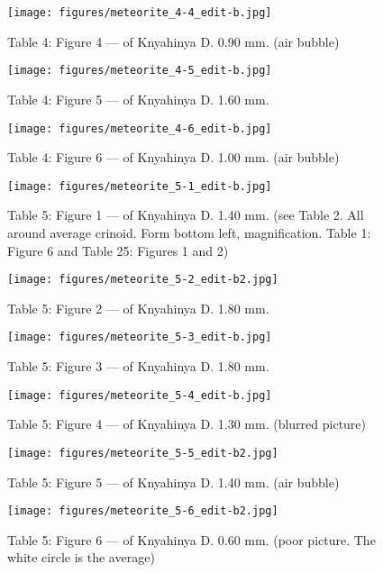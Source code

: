 \documentclass[a4paper, 12pt, oneside]{article}
\begin{document}
\clearpage
\begin{figure}[t]
\texttt{[image: figures/meteorite\_4-4\_edit-b.jpg]}
\caption{Table 4: Figure 4 --- of Knyahinya D. 0.90 mm. (air bubble)}
\centering
\end{figure}
\clearpage
\begin{figure}[t]
\texttt{[image: figures/meteorite\_4-5\_edit-b.jpg]}
\caption{Table 4: Figure 5 --- of Knyahinya D. 1.60 mm.}
\centering
\end{figure}
\clearpage
\begin{figure}[t]
\texttt{[image: figures/meteorite\_4-6\_edit-b.jpg]}
\caption{Table 4: Figure 6 --- of Knyahinya D. 1.00 mm. (air bubble)}
\centering
\end{figure}
\clearpage
\begin{figure}[t]
\texttt{[image: figures/meteorite\_5-1\_edit-b.jpg]}
\caption{Table 5: Figure 1 --- of Knyahinya D. 1.40 mm. (see Table 2. All around average crinoid. Form bottom left, magnification. Table 1: Figure 6 and Table 25: Figures 1 and 2)}
\centering
\end{figure}
\clearpage
\begin{figure}[t]
\texttt{[image: figures/meteorite\_5-2\_edit-b2.jpg]}
\caption{Table 5: Figure 2 --- of Knyahinya D. 1.80 mm.}
\centering
\end{figure}
\clearpage
\begin{figure}[t]
\texttt{[image: figures/meteorite\_5-3\_edit-b.jpg]}
\caption{Table 5: Figure 3 --- of Knyahinya D. 1.80 mm.}
\centering
\end{figure}
\clearpage
\begin{figure}[t]
\texttt{[image: figures/meteorite\_5-4\_edit-b.jpg]}
\caption{Table 5: Figure 4 --- of Knyahinya D. 1.30 mm. (blurred picture)}
\centering
\end{figure}
\clearpage
\begin{figure}[t]
\texttt{[image: figures/meteorite\_5-5\_edit-b2.jpg]}
\caption{Table 5: Figure 5 --- of Knyahinya D. 1.40 mm. (air bubble)}
\centering
\end{figure}
\clearpage
\begin{figure}[t]
\texttt{[image: figures/meteorite\_5-6\_edit-b2.jpg]}
\caption{Table 5: Figure 6 --- of Knyahinya D. 0.60 mm. (poor picture. The white circle is the average)}
\centering
\end{figure}
\end{document}
